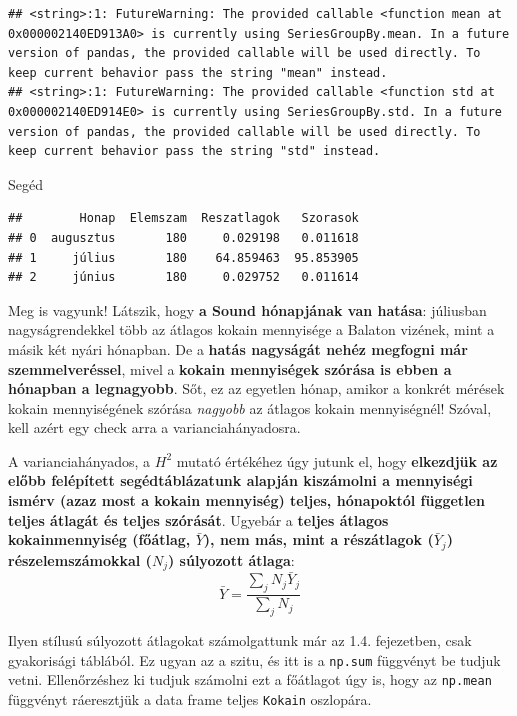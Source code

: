 \documentclass[
]{book}
\newenvironment{Shaded}{\begin{snugshade}}{\end{snugshade}}
\newcommand{\NormalTok}[1]{#1}
\begin{document}
\begin{verbatim}
## <string>:1: FutureWarning: The provided callable <function mean at 0x000002140ED913A0> is currently using SeriesGroupBy.mean. In a future version of pandas, the provided callable will be used directly. To keep current behavior pass the string "mean" instead.
## <string>:1: FutureWarning: The provided callable <function std at 0x000002140ED914E0> is currently using SeriesGroupBy.std. In a future version of pandas, the provided callable will be used directly. To keep current behavior pass the string "std" instead.
\end{verbatim}

\begin{Shaded}
\begin{Highlighting}[]
\NormalTok{Segéd}
\end{Highlighting}
\end{Shaded}

\begin{verbatim}
##        Honap  Elemszam  Reszatlagok   Szorasok
## 0  augusztus       180     0.029198   0.011618
## 1     július       180    64.859463  95.853905
## 2     június       180     0.029752   0.011614
\end{verbatim}

Meg is vagyunk! Látszik, hogy \textbf{a Sound hónapjának van hatása}: júliusban nagyságrendekkel több az átlagos kokain mennyisége a Balaton vizének, mint a másik két nyári hónapban. De a \textbf{hatás nagyságát nehéz megfogni már szemmelveréssel}, mivel a \textbf{kokain mennyiségek szórása is ebben a hónapban a legnagyobb}. Sőt, ez az egyetlen hónap, amikor a konkrét mérések kokain mennyiségének szórása \emph{nagyobb} az átlagos kokain mennyiségnél! Szóval, kell azért egy check arra a varianciahányadosra.

A varianciahányados, a \(H^2\) mutató értékéhez úgy jutunk el, hogy \textbf{elkezdjük az előbb felépített segédtáblázatunk alapján kiszámolni a mennyiségi ismérv (azaz most a kokain mennyiség) teljes, hónapoktól független teljes átlagát és teljes szórását}. Ugyebár a \textbf{teljes átlagos kokainmennyiség (főátlag, \(\bar{Y}\)), nem más, mint a részátlagok (\(\bar{Y}_j\)) részelemszámokkal (\(N_j\)) súlyozott átlaga}: \[\bar{Y}=\frac{\sum_j{N_j\bar{Y}_j}}{\sum_j{N_j}}\]

Ilyen stílusú súlyozott átlagokat számolgattunk már az 1.4. fejezetben, csak gyakorisági táblából. Ez ugyan az a szitu, és itt is a \texttt{np.sum} függvényt be tudjuk vetni. Ellenőrzéshez ki tudjuk számolni ezt a főátlagot úgy is, hogy az \texttt{np.mean} függvényt ráeresztjük a data frame teljes \texttt{Kokain} oszlopára.
\end{document}
